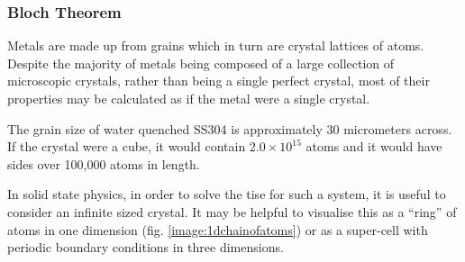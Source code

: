 \subsubsection{Bloch Theorem}
\label{section:blochtheorem}

Metals are made up from grains which in turn are crystal lattices of atoms.  Despite the majority of metals being composed of a large collection of microscopic crystals, rather than being a single perfect crystal, most of their properties may be calculated as if the metal were a single crystal.

The grain size of water quenched SS304 is approximately 30 micrometers across\cite{grainsizesteel}.  If the crystal were a cube, it would contain $2.0 \times 10^{15}$ atoms and it would have sides over 100,000 atoms in length.

In solid state physics, in order to solve the \acrshort{tise} for such a system, it is useful to consider an infinite sized crystal.  It may be helpful to visualise this as a \enquote{ring} of atoms in one dimension (fig. \ref{image:1dchainofatoms}) or as a super-cell with periodic boundary conditions in three dimensions.



